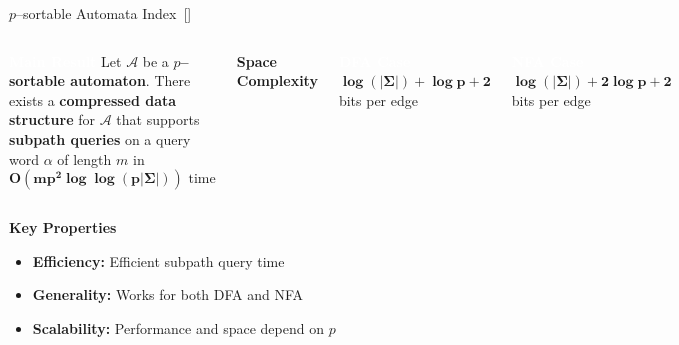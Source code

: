 \documentclass[aspectratio=169]{beamer}
\begin{document}
\begin{frame}{$p$--sortable Automata Index~[\cite{cotumaccio2021indexing}]}
	\begin{columns}[c]
		\begin{block}{\textcolor{white}{\textbf{Main Result}}}
			Let $\mathcal{A}$ be a \textcolor{oiBlue}{\textbf{$p$--sortable automaton}}. There exists a \textcolor{oiGreen}{\textbf{compressed data structure}} for $\mathcal{A}$ that supports \textcolor{oiPurple}{\textbf{subpath queries}} on a query word $\alpha$ of length $m$ in
			\[\mathbf{O(mp^2\log\log(p|\Sigma|))}\text{ time}\]
		\end{block}

		\textcolor{oiGreen}{\textbf{Space Complexity}}
		\begin{block}{\textcolor{white}{\textbf{DFA Case}}}
			$\mathbf{\log(|\Sigma|) + \log p + 2}$ bits per edge
		\end{block}

		\vspace{0.2cm}
		\begin{block}{\textcolor{white}{\textbf{NFA Case}}}
			$\mathbf{\log(|\Sigma|) + 2\log p + 2}$ bits per edge
		\end{block}
	\end{columns}
	\vspace{0.3cm}
	\textcolor{oiRed}{\textbf{Key Properties}}
	\begin{itemize}
		\item \textbf{Efficiency:} Efficient subpath query time
		\item \textbf{Generality:} Works for both DFA and NFA
		\item \textbf{Scalability:} Performance and space depend on $p$
	\end{itemize}
\end{frame}
\end{document}
